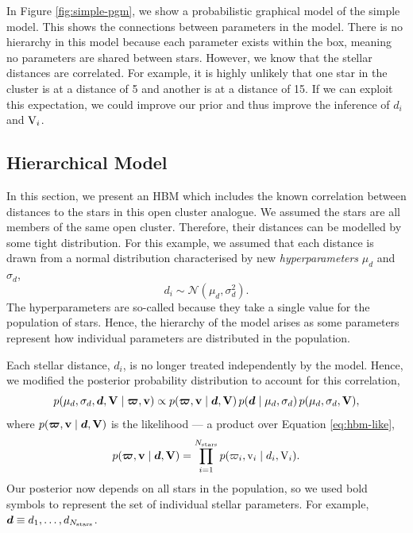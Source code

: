 In Figure \ref{fig:simple-pgm}, we show a probabilistic graphical model of the simple model. This shows the connections between parameters in the model. There is no hierarchy in this model because each parameter exists within the box, meaning no parameters are shared between stars. However, we know that the stellar distances are correlated. For example, it is highly unlikely that one star in the cluster is at a distance of 5 and another is at a distance of 15. If we can exploit this expectation, we could improve our prior and thus improve the inference of \(d_i\) and \(\mathrm{V}_i\).

\subsection{Hierarchical Model}\label{sec:hbm-model}

In this section, we present an HBM which includes the known correlation between distances to the stars in this open cluster analogue. We assumed the stars are all members of the same open cluster. Therefore, their distances can be modelled by some tight distribution. For this example, we assumed that each distance is drawn from a normal distribution characterised by new \emph{hyperparameters} \(\mu_d\) and \(\sigma_d\),
%
\begin{equation}
    d_i \sim \mathcal{N}(\mu_d, \sigma_d^2).
\end{equation}
%
The hyperparameters are so-called because they take a single value for the population of stars. Hence, the hierarchy of the model arises as some parameters represent how individual parameters are distributed in the population.

Each stellar distance, \(d_i\), is no longer treated independently by the model. Hence, we modified the posterior probability distribution to account for this correlation,
%
\begin{equation}
    p(\mu_d, \sigma_d, \bm{d}, \bm{\mathrm{V}} \mid \bm{\varpi}, \bm{\mathrm{v}}) \propto p(\bm{\varpi}, \bm{\mathrm{v}} \mid \bm{d}, \bm{\mathrm{V}}) \, p(\bm{d} \mid \mu_d, \sigma_d) \, p(\mu_d, \sigma_d, \bm{\mathrm{V}}),
\end{equation}
%
where \(p(\bm{\varpi}, \bm{\mathrm{v}} \mid \bm{d}, \bm{\mathrm{V}})\) is the likelihood --- a product over Equation \ref{eq:hbm-like},
%
\begin{equation}
    p(\bm{\varpi}, \bm{\mathrm{v}} \mid \bm{d}, \bm{\mathrm{V}}) = \prod_{i=1}^{N_\mathrm{stars}} p(\varpi_i, \mathrm{v}_i \mid d_i, \mathrm{V}_i).
\end{equation}
%
Our posterior now depends on all stars in the population, so we used bold symbols to represent the set of individual stellar parameters. For example, \(\bm{d} \equiv d_1, \dots, d_{N_\mathrm{stars}}\).

